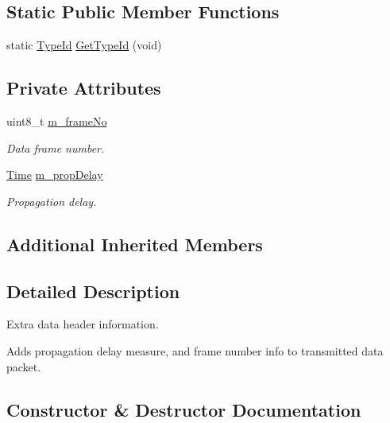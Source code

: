 \subsection*{Static Public Member Functions}
\begin{DoxyCompactItemize}
\item 
static \hyperlink{classns3_1_1TypeId}{Type\+Id} \hyperlink{classns3_1_1UanHeaderRcData_a4e2267477e2e41f096c8b8541d546127}{Get\+Type\+Id} (void)
\end{DoxyCompactItemize}
\subsection*{Private Attributes}
\begin{DoxyCompactItemize}
\item 
uint8\+\_\+t \hyperlink{classns3_1_1UanHeaderRcData_a44293983565792b02d4ea8b16e565e93}{m\+\_\+frame\+No}
\begin{DoxyCompactList}\small\item\em Data frame number. \end{DoxyCompactList}\item 
\hyperlink{classns3_1_1Time}{Time} \hyperlink{classns3_1_1UanHeaderRcData_a2064d62489ffb5549897e06f171f8f68}{m\+\_\+prop\+Delay}
\begin{DoxyCompactList}\small\item\em Propagation delay. \end{DoxyCompactList}\end{DoxyCompactItemize}
\subsection*{Additional Inherited Members}


\subsection{Detailed Description}
Extra data header information.

Adds propagation delay measure, and frame number info to transmitted data packet. 

\subsection{Constructor \& Destructor Documentation}
